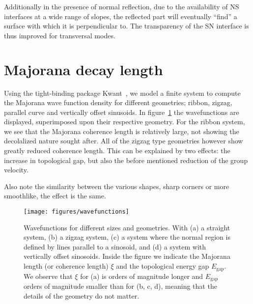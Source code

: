 		Additionally in the presence of normal reflection, due to the availability of NS interfaces at a wide range of slopes, the reflected part will eventually ``find'' a surface with which it is perpendicular to. The transparency of the SN interface is thus improved for transversal modes.

	\section{Majorana decay length}

		Using the tight-binding package Kwant~\cite{groth_kwant:_2014}, we model a finite system to compute the Majorana wave function density for different geometries; ribbon, zigzag, parallel curve and vertically offset sinusoids.
		In figure~\ref{fig:wavefunctions} the wavefunctions are displayed, superimposed upon their respective geometry.
		For the ribbon system, we see that the Majorana coherence length is relatively large, not showing the decolalized nature sought after.
		All of the zigzag type geometries however show greatly reduced coherence length.
		This can be explained by two effects: the increase in topological gap, but also the before mentioned reduction of the group velocity.

		Also note the similarity between the various shapes, sharp corners or more smoothlike, the effect is the same.

		\begin{figure}[!htb]
		\texttt{[image: figures/wavefunctions]}
		\caption{Wavefunctions for different sizes and geometries.
		With (a) a straight system, (b) a zigzag system, (c) a system where the normal region is defined by lines parallel to a sinosoid, and (d) a system with vertically offset sinosoids.
		Inside the figure we indicate the Majorana length (or coherence length) $\xi$ and the topological energy gap $E_\textrm{gap}.$
		We observe that $\xi$ for (a) is orders of magnitude longer and $E_\textrm{gap}$ orders of magnitude smaller than for (b, c, d), meaning that the details of the geometry do not matter.
		\label{fig:wavefunctions}}
		\end{figure}

